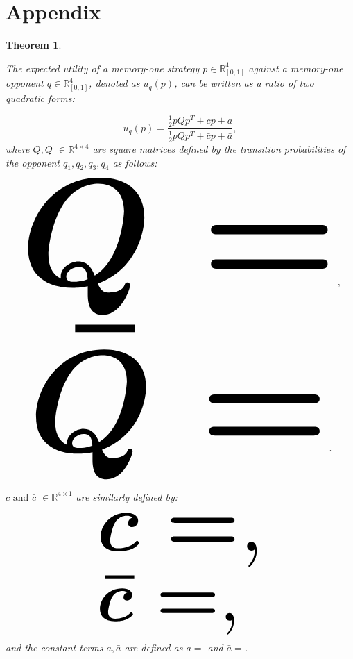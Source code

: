 \documentclass[9pt,twocolumn,twoside,lineno]{pnas-new}
\newcommand{\R}{\mathbb{R}}
\newtheorem{theorem}{Theorem}
\begin{document}
\showmatmethods{} %

\section*{Appendix}

\begin{theorem}\label{theorem_one}

    The expected utility of a memory-one strategy \(p\in\mathbb{R}_{[0,1]}^4\)
    against a memory-one opponent \(q\in\mathbb{R}_{[0,1]}^4\), denoted
    as \(u_q(p)\), can be written as a ratio of two quadratic forms:

    \begin{equation}\label{eq:optimisation_quadratic}
    u_q(p) = \frac{\frac{1}{2}pQp^T + cp + a}
                {\frac{1}{2}p\bar{Q}p^T + \bar{c}p + \bar{a}},
    \end{equation}
    where \(Q, \bar{Q}\) \(\in \R^{4\times4}\) are square matrices defined by the
    transition probabilities of the opponent \(q_1, q_2, q_3, q_4\) as follows:

    \begin{center}
    \begin{equation}
    \resizebox{.95\linewidth}{!}{\arraycolsep=2.5pt%
    \boldmath\(
    Q = \)},
    \end{equation}
    \begin{equation}\label{eq:q_bar_matrix}
    \resizebox{.9\linewidth}{!}{\arraycolsep=2.5pt%
    \boldmath\(
    \bar{Q} =  \)}.
    \end{equation}
    \end{center}

    \(c \text{ and } \bar{c}\) \(\in \R^{4 \times 1}\) are similarly defined by:

    \begin{equation}\label{eq:q_matrix_numerator}
    \resizebox{0.5\linewidth}{!}{\arraycolsep=2.5pt%
    \boldmath\(c = \),}
    \end{equation}
    \begin{equation}\label{eq:q_matrix_denominator}
    \resizebox{0.5\linewidth}{!}{\arraycolsep=2.5pt%
    \boldmath\(\bar{c} = \),
    }
    \end{equation}
    and the constant terms \(a, \bar{a}\) are defined as \(a = \) and
    \(\bar{a} = \).
\end{theorem}
\end{document}
